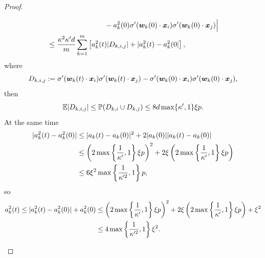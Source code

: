 \documentclass{article}
\begin{document}
\begin{proof}
\begin{enumerate}[(a)]
\begin{enumerate}[(i)]
\begin{equation}
\begin{aligned}
                                 & \quad\quad\quad\quad\quad\quad\quad\quad -a_k^2(0)\sigma'(\bm{w}_k(0)\cdot\bm{x}_i)\sigma'(\bm{w}_k(0)\cdot\bm{x}_j)\Big|                        \\
                                 & \leq \frac{\kappa^2\kappa'd}{m}\sum_{k=1}^m\left[a_k^2(t)\lvert D_{k,i,j}\rvert+|a_k^2(t)-a_k^2(0|\right],
                            \end{aligned}
                        \end{equation}
                        where
                        \begin{equation}
                            D_{k,i,j}:=\sigma'(\bm{w}_k(t)\cdot\bm{x}_i)\sigma'(\bm{w}_k(t)\cdot\bm{x}_j)-\sigma'(\bm{w}_k(0)\cdot\bm{x}_i)\sigma'(\bm{w}_k(0)\cdot\bm{x}_j),
                        \end{equation}
                        then
                        \begin{equation}
                            \mathbb{E}|D_{k,i,j}|\leq\mathbb{P}(D_{k,i}\cup D_{k,j})\leq 8d\max\{\kappa',1\}\xi p.
                        \end{equation}
                        At the same time
                        \begin{equation}
                            \begin{aligned}
                                \lvert a_k^2(t)-a_k^2(0)\rvert
                                 & \leq\lvert a_k(t)-a_k(0)\rvert^2+2\lvert a_k(0)\rvert\lvert a_k(t)-a_k(0)\rvert                                                                     \\
                                 & \leq \left(2\max\left\{\frac{1}{\kappa'},1\right\}\xi p\right)^2+2\xi\left(2\max\left\{\frac{1}{\kappa'},1\right\}\xi p\right) \\
                                 & \leq 6\xi^2\max\left\{\frac{1}{\kappa'^2},1\right\}p,
                            \end{aligned}
                        \end{equation}
                        so
                        \begin{equation}
                            \begin{aligned}
                                a_k^2(t)\leq \abs{a_k^2(t)-a_k^2(0)}+a_k^2(0)
                                 & \leq \left(2\max\left\{\frac{1}{\kappa'},1\right\}\xi p\right)^2+2\xi\left(2\max\left\{\frac{1}{\kappa'},1\right\}\xi p\right) + \xi^2 \\
                                 & \leq 4\max\left\{\frac{1}{\kappa'^2},1\right\}\xi^2.

\end{aligned}
\end{equation}
\end{enumerate}
\end{enumerate}
\end{proof}
\end{document}
